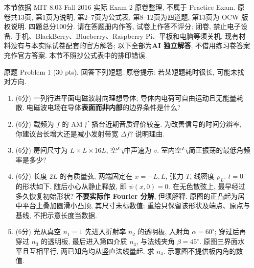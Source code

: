 本节依据 MIT 8.03 Fall 2016 实际 Exam 2 原卷整理, 不属于 Practice Exam. 原卷共13页, 第1页为说明, 第2--7页为公式表, 第8--12页为四道题, 第13页为 OCW 版权说明. 四题总分100分. 请在答题册内作答, 试卷上作答不评分; 闭卷, 禁止电子设备, 手机、BlackBerry、Blueberry、Raspberry Pi、平板和电脑等须关机. 现有材料没有与本实际试卷配套的官方解答; 以下全部为\textbf{AI 独立解答}, 不借用练习卷答案充作官方答案. 本节不照抄公式表中的排印错误.

\begin{exercise}\label{exam:actual2.1}
原题 Problem 1 (30 pts). 回答下列短题. 原卷提示: 若某短题耗时很长, 可能未找对方向.
\begin{enumerate}[label=\Alph*.]
\item (6分) 一列行进平面电磁波射向理想导体; 导体内电荷可自由运动且无能量耗散. 电磁波电场在导体\textbf{表面而非内部}的边界条件是什么?
\item (6分) 载频为 $f$ 的 AM 广播台近期音质评价较差. 为改善信号的时间分辨率, 你建议台长增大还是减小发射带宽 $\Delta f$? 说明理由.
\item (6分) 房间尺寸为 $L\times L\times16L$, 空气中声速为 $v$. 室内空气简正振荡的最低角频率是多少?
\item (6分) 长度 $2L$ 的有质量弦, 两端固定在 $x=-L,L$, 张力 $T$, 线密度 $\rho_L$. $t=0$ 的形状如下, 随后小心从静止释放, 即 $\dot\psi(x,0)=0$. 在无色散弦上, 最早经过多久恢复初始形状? \textbf{不要实际作 Fourier 分解}, 但须解释. 原图的正凸起为居中平台上叠加圆滑小凸顶, 其尺寸未标数值; 重绘只保留该形状及端点、原点与基线, 不把示意长度当数据.
\begin{center}\end{center}
\item (6分) 光从真空 $n_1=1$ 先进入折射率 $n_2$ 的透明板, 入射角 $\alpha=60^\circ$; 穿过后再穿过 $n_3$ 的透明板, 最后进入第四介质 $n_4$, 与法线夹角 $\beta=45^\circ$. 原图三界面水平且互相平行, 两已知角均从竖直法线量起. 求 $n_4$. 示意图不提供板内角的数值.
\begin{center}\end{center}
\end{enumerate}
\end{exercise}
